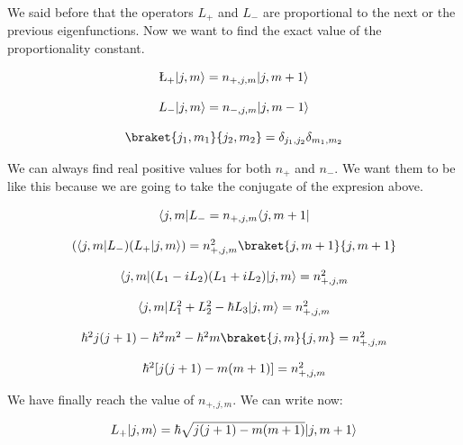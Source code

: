 We said before that the operators $L_+$ and $L_-$ are proportional to the next or the previous eigenfunctions. Now we want to find the exact value of the proportionality constant.

\begin{equation}
  \begin{array}{c}
    \L_+ \ket{j,m} = n_{+,j,m} \ket{j,m+1}
    \\

    \\
    L_- \ket{j,m} = n_{-,j,m} \ket{j,m-1}
    \\

    \\
    \braket{j_1,m_1}{j_2,m_2} = \delta_{j_1,j_2}\delta_{m_1,m_2}
  \end{array}
\end{equation}

We can always find real positive values for both $n_+$ and $n_-$. We want them to be like this because we are going to take the conjugate of the expresion above.

\begin{equation}
  \begin{array}{c}
    \bra{j,m}L_- = n_{+,j,m} \bra{j,m+1}
    \\

    \\
    (\bra{j,m}L_-)(L_+\ket{j,m}) = n_{+,j,m}^2  \braket{j,m+1}{j,m+1}
    \\

    \\
    \bra{j,m}(L_1-iL_2)(L_1+iL_2)\ket{j,m} = n_{+,j,m}^2
    \\

    \\
    \bra{j,m}L_1^2+L_2^2-\hbar L_3\ket{j,m} = n_{+,j,m}^2
    \\

    \\
    \hbar^2 j(j+1) - \hbar^2 m^2 - \hbar^2 m \braket{j,m}{j,m} = n_{+,j,m}^2
    \\

    \\
    \hbar^2 [j(j+1) - m(m+1)] = n_{+,j,m}^2
  \end{array}
\end{equation}

We have finally reach the value of $n_{+,j,m}$. We can write now:

\begin{equation}
  \begin{array}{c}
    L_+ \lvert j,m\rangle = \hbar \sqrt{j(j+1) - m(m+1)} \lvert j,m+1\rangle
  \end{array}
\end{equation}

